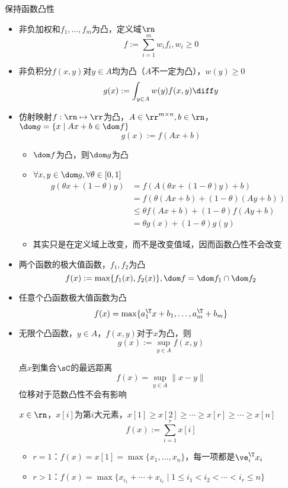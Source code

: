 \documentclass{note}
\begin{document}
保持函数凸性
\begin{itemize}
	\item 非负加权和$f_1,\ldots,f_m$为凸，定义域$\rn$
	\[f:=\sum_{i=1}^m w_if_i,w_i\geq 0\]
	\item 非负积分$f(x,y)$对$y\in A$均为凸（$A$不一定为凸），$w(y)\geq 0$
	\[g(x):=\int_{y\in A}w(y)f(x,y)\diff y\]
	\item 仿射映射$f:\rn\mapsto\rr$为凸，$A\in\rr^{m\times n},b\in\rn$，$\dom g=\{x\mid Ax+b\in\dom f\}$
	\[g(x):=f(Ax+b)\]
	\begin{analysis}
	\begin{itemize}
		\item $\dom f$为凸，则$\dom g$为凸
		\item $\forall x,y\in\dom g,\forall\theta\in[0,1]$
		\[\begin{aligned}
		g(\theta x+(1-\theta)y)&=f(A(\theta x+(1-\theta)y)+b)\\
		&=f(\theta(Ax+b)+(1-\theta)(Ay+b))\\
		&\leq\theta f(Ax+b)+(1-\theta)f(Ay+b)\\
		&=\theta g(x)+(1-\theta)g(y)
		\end{aligned}\]
		\item 其实只是在定义域上改变，而不是改变值域，因而函数凸性不会改变
	\end{itemize}
	\end{analysis}
	\item 两个函数的极大值函数，$f_1,f_2$为凸
	\[f(x):=\max\{f_1(x),f_2(x)\},\dom f=\dom f_1\cap\dom f_2\]
	\item 任意个凸函数极大值函数为凸
	\[f(x)=\max\{a_1^\T x+b_1,\ldots,a_m^\T+b_m\}\]
	\item 无限个凸函数，$y\in A$，$f(x,y)$对于$x$为凸，则
	\[g(x):=\sup_{y\in A} f(x,y)\]
	\begin{example}
	点$x$到集合$\sC$的最远距离
	\[f(x)=\sup_{y\in A}\|x-y\|\]
	位移对于范数凸性不会有影响
	\end{example}
	\begin{example}
	$x\in\rn$，$x[i]$为第$i$大元素，$x[1]\geq x[2]\geq\cdots\geq x[r]\geq\cdots\geq x[n]$
	\[f(x):=\sum_{i=1}^r x[i]\]
	\begin{itemize}
	\item $r=1$：$f(x)=x[1]=\max\{x_1,\ldots,x_n\}$，每一项都是$\ve_i^\T x_i$
	\item $r>1$：$f(x)=\max\{x_{i_1}+\cdots+x_{i_r}\mid 1\leq i_1<i_2<\cdots<i_r\leq n\}$
	\end{itemize}
	\end{example}

\end{itemize}
\end{document}
